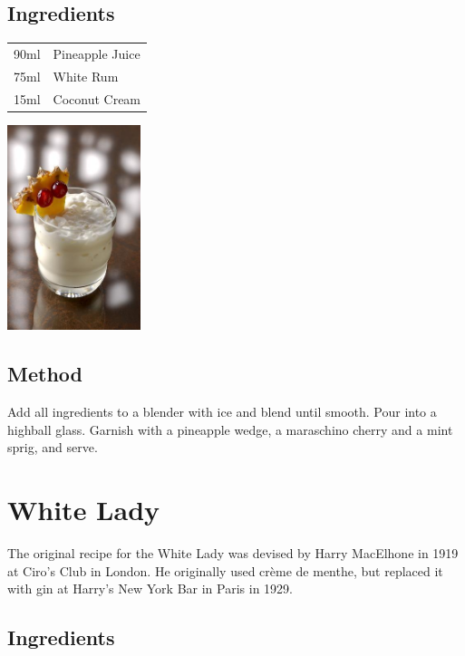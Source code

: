 \documentclass[12pt, letterpaper]{article}
\begin{document}
\subsection*{Ingredients}

\begin{multicols}{2}

\begin{tabular} { r | l}
    90ml & Pineapple Juice \\
    75ml & White Rum \\
    15ml & Coconut Cream
\end{tabular}

\includegraphics[height=6cm]{bahia}

\end{multicols}

\subsection*{Method}
Add all ingredients to a blender with ice and blend until smooth. Pour into a highball glass.
Garnish with a pineapple wedge, a maraschino cherry and a mint sprig, and serve.

\pagebreak
\section{White Lady}
The original recipe for the White Lady was devised by Harry MacElhone in 1919 at Ciro's Club in London.
He originally used crème de menthe, but replaced it with gin at Harry's New York Bar in Paris in 1929.

\subsection*{Ingredients}
\end{document}
